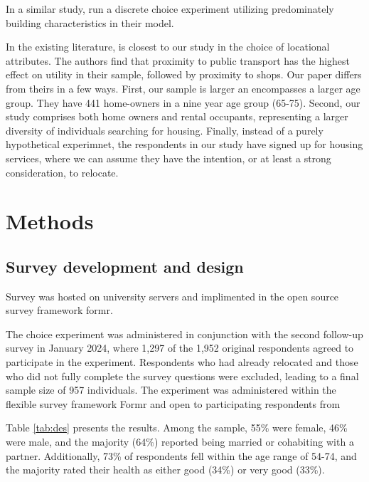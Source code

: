 \documentclass[3p,11pt ]{elsarticle}
\begin{document}
\clearpage





In a similar study,\cite{ossokinaBestLivingConcepts2020} 
run a discrete choice experiment utilizing predominately building characteristics in their model.

In the existing literature,
\cite{ossokinaReferencedependentHousingChoice2022a} is closest to our study in the choice of locational attributes.
The authors find that proximity to public transport has the highest effect on utility in their sample, followed by proximity to shops.
Our paper differs from theirs in a few ways.
First,
our sample is larger an encompasses a larger age group.
They have 441 home-owners in a nine year age group (65-75).
Second,
our study comprises both home owners and rental occupants, representing a larger diversity of individuals searching for housing.
Finally,
instead of a purely hypothetical experimnet, the respondents in our study have signed up for housing services, where we can assume they have the intention, or at least a strong consideration, to relocate.







\newpage

\section{Methods}

\subsection{Survey development and design}




Survey was hosted on university servers and implimented in the open source survey framework formr.


The choice experiment was administered in conjunction with the second follow-up survey in January 2024,
where 1,297 of the 1,952 original respondents agreed to participate in the experiment.
Respondents who had already relocated and those who did not fully complete the survey questions were excluded, leading to a final sample size of 957 individuals.
The experiment was administered within the flexible survey framework Formr and open to participating respondents from 

Table \ref{tab:des} presents the results.
Among the sample, 55\% were female, 46\% were male, and the majority (64\%) reported being married or cohabiting with a partner. Additionally, 73\% of respondents fell within the age range of 54-74, and the majority rated their health as either good (34\%) or very good (33\%).
\end{document}
